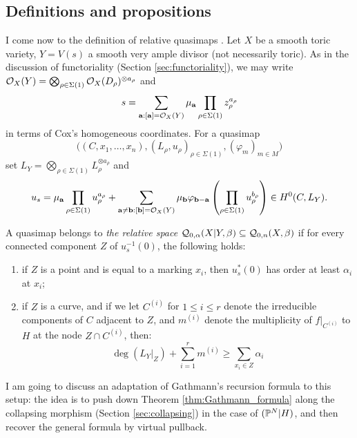 \subsection{Definitions and propositions}
I come now to the definition of relative quasimaps \cite[\S 2.3]{BN}. Let $X$ be a smooth toric variety, $Y=V(s)$ a smooth very ample divisor (not necessarily toric). As in the discussion of functoriality (Section \ref{sec:functoriality}), we may write $\mathcal{O}_X(Y)=\bigotimes_{\rho\in\Sigma(1)}\mathcal{O}_X(D_\rho)^{\otimes a_\rho}$ and 
\[s=\sum_{\mathbf a:[\mathbf a]=\mathcal{O}_X(Y)}\mu_{\mathbf a}\prod_{\rho\in\Sigma(1)}z_\rho^{a_\rho}\]
in terms of Cox's homogeneous coordinates. For a quasimap 
\[ \Big((C,x_1,\ldots,x_n), (L_\rho,u_\rho)_{\rho \in \Sigma(1)}, (\varphi_m)_{m \in M}\Big) \]
set $L_Y=\bigotimes_{\rho\in\Sigma(1)}L_\rho^{\otimes a_\rho}$ and
\[u_s=\mu_{\mathbf a}\prod_{\rho\in\Sigma(1)}u_\rho^{a_\rho}+\sum_{\mathbf a\neq \mathbf b:[\mathbf b]=\mathcal{O}_X(Y)}\mu_{\mathbf b}\varphi_{\mathbf b-\mathbf a}\left(\prod_{\rho\in\Sigma(1)}u_\rho^{b_\rho}\right)\in H^0(C,L_Y).\]
\begin{definition}
 A quasimap belongs to \emph{the relative space} $\mathcal{Q}_{0,\alpha}(X|Y,\beta)\subseteq \mathcal{Q}_{0,n}(X,\beta)$ if for every connected component $Z$ of $u_s^{-1}(0)$, the following holds:
\begin{enumerate}
\item if $Z$ is a point and is equal to a marking $x_i$, then $u_s^*(0)$ has order at least $\alpha_i$ at $x_i$;
\item if $Z$ is a curve, and if we let $C^{(i)}$ for $1 \leq i \leq r$ denote the irreducible components of $C$ adjacent to $Z$, and $m^{(i)}$ denote the multiplicity of $f|_{C^{(i)}}$ to $H$ at the node $Z \cap C^{(i)}$, then:
\begin{equation} \label{Relative quasimap internal component inequality} \deg(L_{Y}|_Z) + \sum_{i=1}^r m^{(i)} \geq \sum_{x_i \in Z} \alpha_i \end{equation}
\end{enumerate}
\end{definition}

I am going to discuss an adaptation of Gathmann's recursion formula to this setup: the idea is to push down Theorem \ref{thm:Gathmann_formula} along the collapsing morphism (Section \ref{sec:collapsing}) in the case of $(\mathbb P^N|H)$, and then recover the general formula by virtual pullback.

